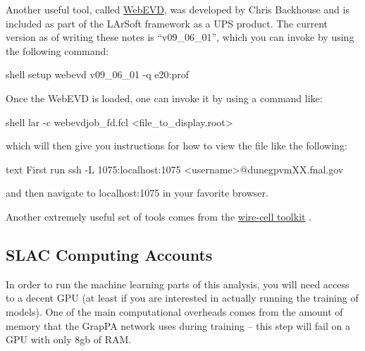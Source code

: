 \documentclass[8pt]{refart}
\begin{document}
\label{webevd}Another useful tool, called \href{https://github.com/LArSoft/webevd}{WebEVD},  was developed by Chris Backhouse and is included as part of the LArSoft framework as a UPS product.  The current version as of writing these notes is ``v09\_06\_01'', which you can invoke by using the following command:
\begin{code}{shell}
setup webevd v09_06_01 -q e20:prof
\end{code}
Once the WebEVD is loaded, one can invoke it by using a command like:
\begin{code}{shell}
lar -c webevdjob_fd.fcl <file_to_display.root>
\end{code}
which will then give you instructions for how to view the file like the following:
\begin{code}{text}
First run
ssh -L 1075:localhost:1075 <username>@dunegpvmXX.fnal.gov

and then navigate to localhost:1075 in your favorite browser.
\end{code}

Another extremely useful set of tools comes from the \href{https://github.com/WireCell}{wire-cell toolkit} \cite{WCT}.


\subsection{SLAC Computing Accounts}\label{slaccomputing}
In order to run the machine learning parts of this analysis, you will need access to a decent GPU (at least if you are interested in actually running the training of models).  One of the main computational overheads comes from the amount of memory that the GrapPA network uses during training -- this step will fail on a GPU with only 8gb of RAM.
\end{document}
